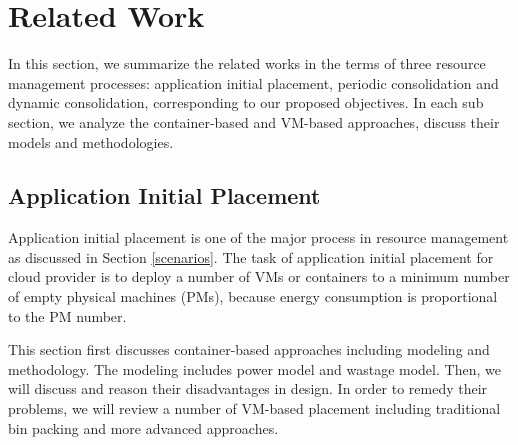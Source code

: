 
\section{Related Work}
\label{related_work}
In this section, we summarize the related works in the terms of three resource management processes: application initial placement, periodic consolidation and dynamic consolidation, corresponding to our proposed objectives. In each sub section, we analyze the container-based and VM-based approaches, discuss their models and methodologies. 

\subsection{Application Initial Placement}
Application initial placement is one of the major process in resource management as discussed in Section \ref{scenarios}. 
The task of application initial placement for cloud provider is to deploy a number of VMs or containers to a minimum number of empty physical machines (PMs), because energy consumption is proportional to the PM number.

This section first discusses container-based approaches including modeling and methodology. The modeling includes power model and wastage model. Then, we will discuss and reason their disadvantages in design. In order to remedy their problems, we will review a number of VM-based placement including traditional bin packing and more advanced approaches.





